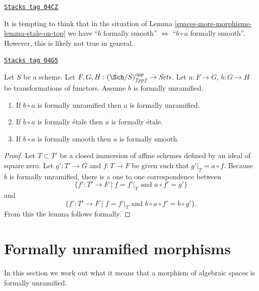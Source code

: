 \begin{remark}[Tempting]
\label{spaces-more-morphisms-remark-tempting}
\href{https://stacks.math.columbia.edu/tag/04CZ}{\texttt{Stacks tag 04CZ}}

It is tempting to think that in the situation of
Lemma \ref{spaces-more-morphisms-lemma-etale-on-top}
we have
``$b$ formally smooth'' $\Leftrightarrow$ ``$b \circ a$ formally smooth''.
However, this is likely not true in general.
\end{remark}

\begin{lemma}
\label{spaces-more-morphisms-lemma-formally-permanence}
\href{https://stacks.math.columbia.edu/tag/04G5}{\texttt{Stacks tag 04G5}}

Let $S$ be a scheme.
Let $F, G, H : (\Sch/S)_{fppf}^{opp} \to \textit{Sets}$.
Let $a : F \to G$, $b : G \to H$ be transformations of functors.
Assume $b$ is formally unramified.
\begin{enumerate}
\item If $b \circ a$ is formally unramified then $a$ is formally unramified.
\item If $b \circ a$ is formally \'etale then $a$ is formally \'etale.
\item If $b \circ a$ is formally smooth then $a$ is formally smooth.
\end{enumerate}
\end{lemma}

\begin{proof}
Let $T \subset T'$ be a closed immersion of affine schemes defined by an ideal
of square zero. Let $g' : T' \to G$ and $f : T \to F$ be given such that
$g'|_T = a \circ f$. Because $b$ is formally unramified, there is a one
to one correspondence between
$$
\{f' : T' \to F \mid f = f'|_T\text{ and }a \circ f' = g'\}
$$
and
$$
\{f' : T' \to F \mid f = f'|_T\text{ and }b \circ a \circ f' = b \circ g'\}.
$$
From this the lemma follows formally.
\end{proof}

\section{Formally unramified morphisms}
\label{spaces-more-morphisms-section-formally-unramified}
In this section we work out what it means that a morphism of algebraic spaces
is formally unramified.

